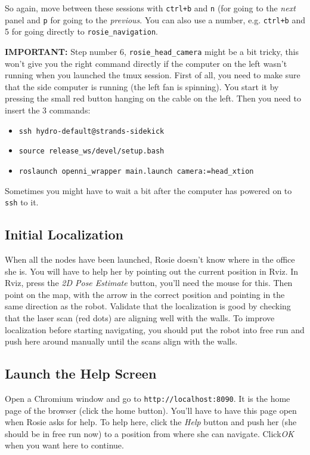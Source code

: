 \documentclass[a4paper,11pt]{article}
\begin{document}
So again, move between these sessions with \texttt{ctrl+b} and \texttt{n} (for going to the \textit{next} panel and \texttt{p} for going to the \textit{previous}. You can also use a number, e.g. \texttt{ctrl+b} and 5 for going directly to \texttt{rosie\_navigation}.

\textbf{IMPORTANT:} Step number 6, \texttt{rosie\_head\_camera} might be a bit
tricky, this won't give you the right command directly if the computer on the left
wasn't running when you launched the tmux session. First of all, you need to
make sure that the side computer is running (the left fan is spinning).
You start it by pressing the small red button hanging on the cable on the left.
Then you need to insert the 3 commands:

\begin{itemize}
\item \texttt{ssh hydro-default@strands-sidekick}
\item \texttt{source release\_ws/devel/setup.bash}
\item \texttt{roslaunch openni\_wrapper main.launch camera:=head\_xtion}
\end{itemize}

Sometimes you might have to wait a bit after the computer has powered on
to \texttt{ssh} to it.

\subsection{Initial Localization}

When all the nodes have been launched, Rosie doesn't know where in the office
she is. You will have to help her by pointing out the current position in Rviz.
In Rviz, press the \textit{2D Pose Estimate} button, you'll need the mouse
for this. Then point on the map, with the arrow in the correct position and
pointing in the same direction as the robot. Validate that the localization is
good by checking that the laser scan (red dots) are aligning well with the walls.
To improve localization before starting navigating, you should put the robot
into free run and push here around manually until the scans align with the walls.

\subsection{Launch the Help Screen}
\label{help}

Open a Chromium window and go to \texttt{http://localhost:8090}. It is the
home page of the browser (click the home button). You'll have to have this
page open when Rosie asks for help. To help here, click the \textit{Help}
button and push her (she should be in free run now) to a position from
where she can navigate. Click\textit{OK} when you want here to continue.
\end{document}
